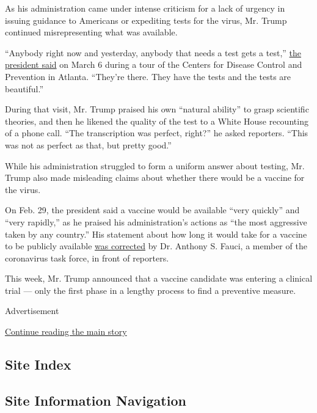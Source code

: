As his administration came under intense criticism for a lack of urgency
in issuing guidance to Americans or expediting tests for the virus, Mr.
Trump continued misrepresenting what was available.

``Anybody right now and yesterday, anybody that needs a test gets a
test,''
\href{https://www.whitehouse.gov/briefings-statements/remarks-president-trump-tour-centers-disease-control-prevention-atlanta-ga/}{the
president said} on March 6 during a tour of the Centers for Disease
Control and Prevention in Atlanta. ``They're there. They have the tests
and the tests are beautiful.''

During that visit, Mr. Trump praised his own ``natural ability'' to
grasp scientific theories, and then he likened the quality of the test
to a White House recounting of a phone call. ``The transcription was
perfect, right?'' he asked reporters. ``This was not as perfect as that,
but pretty good.''

While his administration struggled to form a uniform answer about
testing, Mr. Trump also made misleading claims about whether there would
be a vaccine for the virus.

On Feb. 29, the president said a vaccine would be available ``very
quickly'' and ``very rapidly,'' as he praised his administration's
actions as ``the most aggressive taken by any country.'' His statement
about how long it would take for a vaccine to be publicly available
\href{https://www.nytimes3xbfgragh.onion/2020/03/08/health/fauci-coronavirus.html}{was
corrected} by Dr. Anthony S. Fauci, a member of the coronavirus task
force, in front of reporters.

This week, Mr. Trump announced that a vaccine candidate was entering a
clinical trial --- only the first phase in a lengthy process to find a
preventive measure.

Advertisement

\protect\hyperlink{after-bottom}{Continue reading the main story}

\hypertarget{site-index}{%
\subsection{Site Index}\label{site-index}}

\hypertarget{site-information-navigation}{%
\subsection{Site Information
Navigation}\label{site-information-navigation}}

